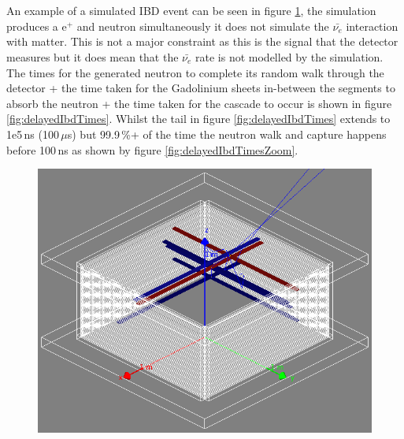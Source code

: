 \\\\An example of a simulated IBD event can be seen in figure \ref{fig:simultaedIbdEvent}, the simulation produces a e$^+$ and neutron simultaneously it does not simulate the $\bar{\nu_e}$ interaction with matter. This is not a major constraint as this is the signal that the detector measures but it does mean that the $\bar{\nu_e}$ rate is not modelled by the simulation. The times for the generated neutron to complete its random walk through the detector + the time taken for the Gadolinium sheets in-between the segments to absorb the neutron + the time taken for the cascade to occur is shown in figure \ref{fig:delayedIbdTimes}. Whilst the tail in figure \ref{fig:delayedIbdTimes} extends to 1e5\,ns (100\,$\mu$s) but 99.9\,\%+ of the time the neutron walk and capture happens before 100\,ns as shown by figure \ref{fig:delayedIbdTimesZoom}.

\begin{figure}[htbp]
 \centering
 \includegraphics[width=0.7\linewidth]{Chapter4/Figs/Raster/simultaedIbdEvent.png}
 \label{fig:simultaedIbdEvent}
\end{figure} 

